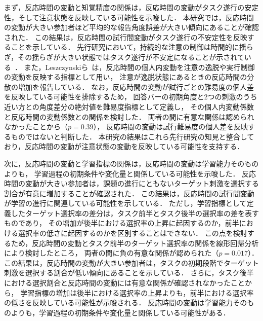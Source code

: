 まず，反応時間の変動と知覚精度の関係は，反応時間の変動がタスク遂行の安定性，そして注意状態を反映している可能性を示唆した．
本研究では，反応時間の変動が大きい参加者ほど平均的な報告角度誤差が大きい傾向にあることが確認された．
この結果は，反応時間の試行間変動がタスク遂行の不安定性を反映することを示している．
先行研究において，持続的な注意の制御は時間的に揺らぎ，その揺らぎが大きい状態ではタスク遂行が不安定になることが示されている~\cite{west2002lapses}．
また，Leszczynskiら~\cite{leszczynski2017mind}は，反応時間の個人内変動を注意の逸脱や実行制御の変動を反映する指標として用い，
注意が逸脱状態にあるときの反応時間の分散の増加を報告している．
なお，反応時間の変動が試行ごとの難易度の個人差を反映している可能性を排除するため，
回答バーの初期角度と2つの刺激のうち近い方との角度差分の絶対値を難易度指標として定義し，
その個人内変動係数と反応時間の変動係数との関係を検討した．
両者の間に有意な関係は認められなかったことから（$p = 0.39$），
反応時間の変動は試行難易度の個人差を反映するものではないと判断した．
本研究の結果はこれら先行研究の知見と整合しており，反応時間の変動が注意状態の変動を反映している可能性を支持する．


次に，反応時間の変動と学習指標の関係は，反応時間の変動は学習能力そのものよりも，
学習過程の初期条件や変化量と関係している可能性を示唆した．
反応時間の変動が大きい参加者は，課題の進行にともないターゲット刺激を選択する割合が有意に増加することが確認された．
この結果は，反応時間の試行間変動が学習の進行に関連している可能性を示している．
ただし，学習指標として定義したターゲット選択率の差分は，タスク前半とタスク後半の選択率の差を表すものであり，
その増加が後半における選択率の上昇に起因するのか，前半における選択率の低さに起因するのかを区別することはできない．
この点を検討するため，反応時間の変動とタスク前半のターゲット選択率の関係を線形回帰分析により検討したところ，
両者の間に負の有意な関係が認められた（$p = 0.017$）．
この結果は，反応時間の変動が大きい参加者は，タスクの初期段階でターゲット刺激を選択する割合が低い傾向にあることを示している．
さらに，タスク後半における選択割合と反応時間の変動には有意な関係が確認されなかったことから，
学習指標の増加は後半における選択率の上昇よりも，前半における選択率の低さを反映している可能性が示唆される．
反応時間の変動は学習能力そのものよりも，学習過程の初期条件や変化量と関係している可能性がある．


